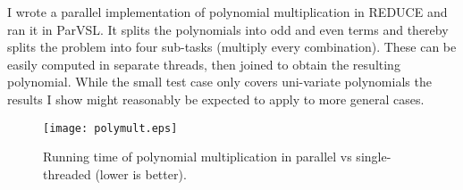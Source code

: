 I wrote a parallel implementation of polynomial multiplication in REDUCE
and ran it in ParVSL. It splits the polynomials into odd and even
terms and thereby splits the problem into four sub-tasks (multiply every combination).
These can be easily computed in separate threads, then joined to obtain the
resulting polynomial. While the small test case only covers uni-variate
polynomials the results I show might reasonably be expected to apply to
more general cases.


\begin{figure}[H]
  \centering
  \texttt{[image: polymult.eps]}
  \caption[Parallel polynomial multiplication results.]{Running time of polynomial multiplication in parallel vs single-threaded (lower is better).}
  \label{fig:parpolymult}
\end{figure}


